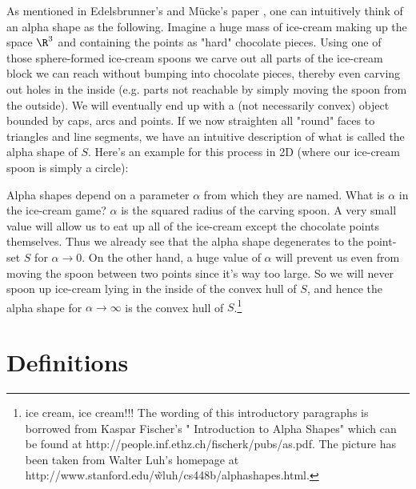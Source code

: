 As mentioned in Edelsbrunner's and M\"ucke's paper \cite{em-tdas-94},
one can intuitively think of an alpha shape  as the
following. Imagine a huge mass of ice-cream making up the space $\R^3$
and containing the points as "hard" chocolate pieces. Using one of
those sphere-formed ice-cream spoons we carve out all parts of the
ice-cream block we can reach without bumping into chocolate pieces,
thereby even carving out holes in the inside (e.g. parts not reachable
by simply moving the spoon from the outside). We will eventually end
up with a (not necessarily convex) object bounded by caps, arcs and
points. If we now straighten all "round" faces to triangles and line
segments, we have an intuitive description of what is called the
alpha shape  of $S$. Here's an example for this process in 2D (where
our ice-cream spoon is simply a circle):

Alpha shapes depend on a parameter $\alpha$ from which they
are named.                                                                  
What is $\alpha$ in the ice-cream game?  $\alpha$ is the squared radius of the
carving spoon. A very small value will allow us to eat up all of the
ice-cream except the chocolate points themselves. Thus we already see
that the alpha shape  degenerates to the point-set $S$ for
$\alpha \rightarrow 0$. On the other hand, a huge value of $\alpha$
will prevent us even from moving the spoon between two points since
it's way too large. So we will never spoon up ice-cream lying in the
inside of the convex hull of $S$, and hence the alpha shape  for
$\alpha \rightarrow \infty$ is the convex hull of $S$.\footnote{ice cream, ice cream!!!
The wording of this introductory paragraphs is borrowed from  Kaspar Fischer's
" Introduction to Alpha Shapes" which can be found at 
http://people.inf.ethz.ch/fischerk/pubs/as.pdf.
The picture has been taken from Walter Luh's homepage at
http://www.stanford.edu/\~wluh/cs448b/alphashapes.html.}


\section{Definitions}


